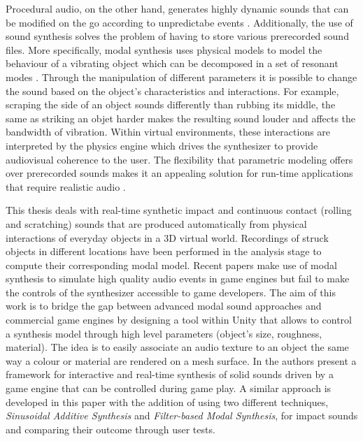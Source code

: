 Procedural audio, on the other hand, generates highly dynamic sounds that can be modified on the go according to unpredictabe events \cite{farnell2010designing}. Additionally, the use of sound synthesis solves the problem of having to store various prerecorded sound files. More specifically, modal synthesis uses physical models to model the behaviour of a vibrating object which can be decomposed in a set of resonant modes \cite{bilbao2009numerical}. Through the manipulation of different parameters it is possible to change the sound based on the object's characteristics and interactions. For example, scraping the side of an object sounds differently than rubbing its middle, the same as striking an objet harder makes the resulting sound louder and affects the bandwidth of vibration. Within virtual environments, these interactions are interpreted by the physics engine which drives the synthesizer to provide audiovisual coherence to the user.  The flexibility that parametric modeling offers over prerecorded sounds makes it an appealing solution for run-time applications that require realistic audio \cite{Cook:2002:RSS:515316}. 

This thesis deals with real-time synthetic impact and continuous contact (rolling and scratching) sounds that are produced automatically from physical interactions of everyday objects in a 3D virtual world. Recordings of struck objects in different locations have been performed in the analysis stage to compute their corresponding modal model. Recent papers \cite{lloyd2011sound, bonneel2008fast} make use of modal synthesis to simulate high quality audio events in game engines but fail to make the controls of the synthesizer accessible to game developers. The aim of this work is to bridge the gap between advanced modal sound approaches and commercial game engines by designing a tool within Unity\textsuperscript{\textregistered} that allows to control a synthesis model through high level parameters (object's size, roughness, material). The idea is to easily associate an audio texture to an object the same way  a colour or material are rendered on a mesh surface. In \cite{pruvost2015perception} the authors present a framework for interactive and real-time synthesis of solid sounds driven by a game engine that can be controlled during game play. A similar approach is developed in this paper with the addition of using two different techniques, \textit{Sinusoidal Additive Synthesis} and \textit{Filter-based Modal Synthesis}, for impact sounds and comparing their outcome through user tests. 

